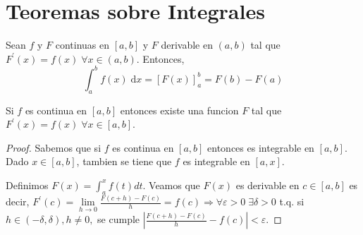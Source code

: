 \section{Teoremas sobre Integrales}
\begin{theorem}
	Sean \(f \) y \(F \) continuas en \([a,b ]\) y \(F \) derivable en \((a,b )\) tal que \(F^\prime (x) = f(x) \; \forall x \in (a,b)\). Entonces, 
	\[
		\int^{b}_a f(x) \; \mathrm{d}x = \left [F(x) \right ]^{b}_a = F(b) - F(a)
	\]
\end{theorem}
\begin{theorem}
	Si \(f \) es continua en \([a,b ]\) entonces existe una funcion \(F \) tal que \(F^\prime (x) = f(x) \; \forall x \in [a,b ]\).
\end{theorem}
\begin{proof}
	Sabemos que si \(f \) es continua en \([a,b ]\) entonces es integrable en \([a,b ]\). Dado \(x \in [a,b ]\), tambien se tiene que \(f \) es integrable en \([a,x ]\).
	
	Definimos \(F(x) = \int^{x}_a f(t) dt  \). Veamos que \(F(x )\) es derivable en \(c \in [a,b ]\) es decir, \(F^\prime (c) = \lim\limits_{h  \to 0 } \frac{F(c + h) - F(c )}{h} = f(c) \Rightarrow \forall \varepsilon > 0 \;\exists \delta > 0\) t.q. si \(h \in (-\delta, \delta), h \neq 0,\) se cumple \(\left\vert \frac{F(c+h) - F(c)}{h} - f(c) \right\vert < \varepsilon \).
	

\end{proof}
